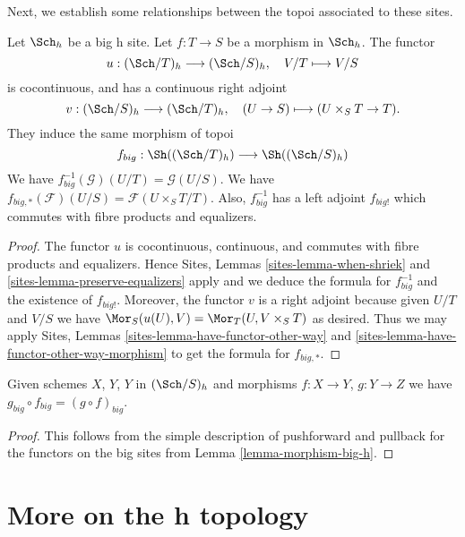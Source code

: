 \noindent
Next, we establish some relationships between the topoi
associated to these sites.

\begin{lemma}
\label{lemma-morphism-big-h}
Let $\Sch_h$ be a big h site.
Let $f : T \to S$ be a morphism in $\Sch_h$.
The functor
$$
u : (\Sch/T)_h \longrightarrow (\Sch/S)_h,
\quad
V/T \longmapsto V/S
$$
is cocontinuous, and has a continuous right adjoint
$$
v : (\Sch/S)_h \longrightarrow (\Sch/T)_h,
\quad
(U \to S) \longmapsto (U \times_S T \to T).
$$
They induce the same morphism of topoi
$$
f_{big} :
\Sh((\Sch/T)_h)
\longrightarrow
\Sh((\Sch/S)_h)
$$
We have $f_{big}^{-1}(\mathcal{G})(U/T) = \mathcal{G}(U/S)$.
We have $f_{big, *}(\mathcal{F})(U/S) = \mathcal{F}(U \times_S T/T)$.
Also, $f_{big}^{-1}$ has a left adjoint $f_{big!}$ which commutes with
fibre products and equalizers.
\end{lemma}

\begin{proof}
The functor $u$ is cocontinuous, continuous, and commutes with fibre products
and equalizers. Hence
Sites, Lemmas \ref{sites-lemma-when-shriek} and
\ref{sites-lemma-preserve-equalizers}
apply and we deduce the formula
for $f_{big}^{-1}$ and the existence of $f_{big!}$. Moreover,
the functor $v$ is a right adjoint because given $U/T$ and $V/S$
we have $\Mor_S(u(U), V) = \Mor_T(U, V \times_S T)$
as desired. Thus we may apply
Sites, Lemmas \ref{sites-lemma-have-functor-other-way} and
\ref{sites-lemma-have-functor-other-way-morphism} to get the
formula for $f_{big, *}$.
\end{proof}

\begin{lemma}
\label{lemma-composition-h}
Given schemes $X$, $Y$, $Y$ in $(\Sch/S)_h$
and morphisms $f : X \to Y$, $g : Y \to Z$ we have
$g_{big} \circ f_{big} = (g \circ f)_{big}$.
\end{lemma}

\begin{proof}
This follows from the simple description of pushforward
and pullback for the functors on the big sites from
Lemma \ref{lemma-morphism-big-h}.
\end{proof}










\section{More on the h topology}
\label{section-h-more}

